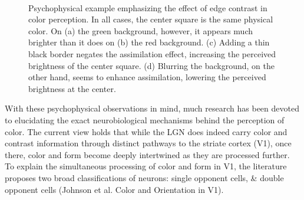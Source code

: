 \documentclass[journal,onecolumn]{IEEEtran}
\begin{document}
\begin{figure}[H]
    \centering
    ~
    ~
    ~
    \caption{Psychophysical example emphasizing the effect of edge contrast in color perception. In all cases, the center square is the same physical color. On (a) the green background, however, it appears much brighter than it does on (b) the red background. (c) Adding a thin black border negates the assimilation effect, increasing the perceived brightness of the center square. (d) Blurring the background, on the other hand, seems to enhance assimilation, lowering the perceived brightness at the center.}
    \label{fig:blur-effect}
\end{figure}

With these psychophysical observations in mind, much research has been devoted to elucidating the exact neurobiological mechanisms behind the perception of color. The current view holds that while the LGN does indeed carry color and contrast information through distinct pathways to the striate cortex (V1), once there, color and form become deeply intertwined as they are processed further. To explain the simultaneous processing of color and form in V1, the literature proposes two broad classifications of neurons: single opponent cells, \& double opponent cells (Johnson et al. Color and Orientation in V1).
\end{document}
